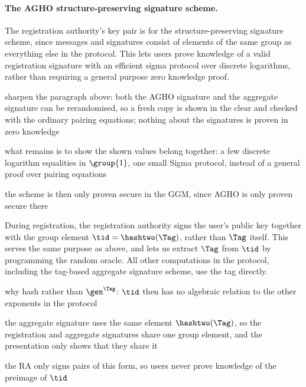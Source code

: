 \paragraph{The AGHO structure-preserving signature scheme.} The registration authority's key pair is for the structure-preserving signature
scheme, since messages and signatures consist of elements of the same group as
everything else in the protocol. This lets users prove knowledge of a valid
registration signature with an efficient sigma protocol over discrete
logarithms, rather than requiring a general purpose zero knowledge proof.

\begin{outline}
  \item sharpen the paragraph above: both the AGHO signature and the aggregate signature can be rerandomised, so a fresh copy is shown in the clear and checked with the ordinary pairing equations; nothing about the signatures is proven in zero knowledge
  \item what remains is to show the shown values belong together: a few discrete logarithm equalities in $\group{1}$, one small Sigma protocol, instead of a general proof over pairing equations
  \item the scheme is then only proven secure in the GGM, since AGHO is only proven secure there
\end{outline}

During registration, the registration authority signs the user's public key
together with the group element $\tid = \hashtwo(\Tag)$, rather than $\Tag$
itself. This serves the same purpose as above, and lets us extract $\Tag$ from
$\tid$ by programming the random oracle. All other computations in the protocol,
including the tag-based aggregate signature scheme, use the tag directly.

\begin{outline}
  \item why hash rather than $\gen^\Tag$: $\tid$ then has no algebraic relation to the other exponents in the protocol
  \item the aggregate signature uses the same element $\hashtwo(\Tag)$, so the registration and aggregate signatures share one group element, and the presentation only shows that they share it
  \item the RA only signs pairs of this form, so users never prove knowledge of the preimage of $\tid$
\end{outline}

